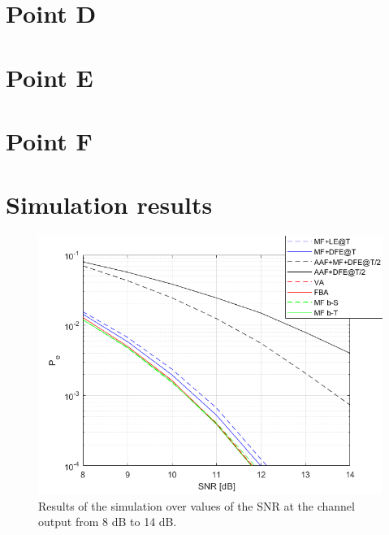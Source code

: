 \documentclass[a4paper,11.5pt]{article}
\begin{document}
\section*{Point D} 

\section*{Point E}

\section*{Point F}

\section*{Simulation results}

\begin{figure}[ht]
	\begin{center}   
		\includegraphics[width=\textwidth]{figs/SNR_Pe.png} 
		\caption{Results of the simulation over values of the SNR at the channel output from 8 dB to 14 dB.}
		\label{fig:B_b}
	\end{center}
\end{figure}
\end{document}
